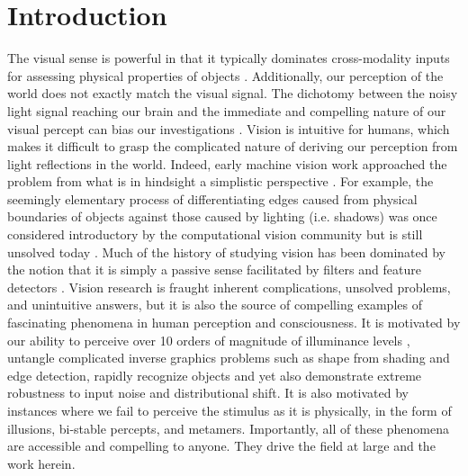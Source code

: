 \chapter{Introduction}
The visual sense is powerful in that it typically dominates cross-modality inputs for assessing physical properties of objects \cite{ernst2002humans}. Additionally, our perception of the world does not exactly match the visual signal. The dichotomy between the noisy light signal reaching our brain and the immediate and compelling nature of our visual percept can bias our investigations \cite{rodieck1998first}. Vision is intuitive for humans, which makes it difficult to grasp the complicated nature of deriving our perception from light reflections in the world. Indeed, early machine vision work approached the problem from what is in hindsight a simplistic perspective \cite{papert1966summer}. For example, the seemingly elementary process of differentiating edges caused from physical boundaries of objects against those caused by lighting (i.e. shadows) was once considered introductory by the computational vision community but is still unsolved today \cite{adelson2000lightness, barron2012shape}. Much of the history of studying vision has been dominated by the notion that it is simply a passive sense facilitated by filters and feature detectors \cite{olshausen201320}. Vision research is fraught inherent complications, unsolved problems, and unintuitive answers, but it is also the source of compelling examples of fascinating phenomena in human perception and consciousness. It is motivated by our ability to perceive over 10 orders of magnitude of illuminance levels \cite{norton2002psychophysical}, untangle complicated inverse graphics problems such as shape from shading and edge detection, rapidly recognize objects and yet also demonstrate extreme robustness to input noise and distributional shift. It is also motivated by instances where we fail to perceive the stimulus as it is physically, in the form of illusions, bi-stable percepts, and metamers. Importantly, all of these phenomena are accessible and compelling to anyone. They drive the field at large and the work herein.

